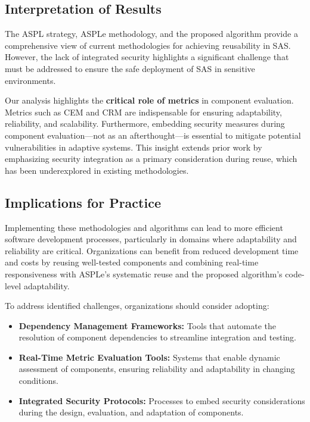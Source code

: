 \documentclass[a4paper,10pt]{article}
\begin{document}
\subsection{Interpretation of Results}

The ASPL strategy, ASPLe methodology, and the proposed algorithm provide a comprehensive view of current methodologies for achieving reusability in SAS. However, the lack of integrated security highlights a significant challenge that must be addressed to ensure the safe deployment of SAS in sensitive environments.

Our analysis highlights the \textbf{critical role of metrics} in component evaluation. Metrics such as CEM and CRM are indispensable for ensuring adaptability, reliability, and scalability. Furthermore, embedding security measures during component evaluation—not as an afterthought—is essential to mitigate potential vulnerabilities in adaptive systems. This insight extends prior work by emphasizing security integration as a primary consideration during reuse, which has been underexplored in existing methodologies.

\subsection{Implications for Practice}

Implementing these methodologies and algorithms can lead to more efficient software development processes, particularly in domains where adaptability and reliability are critical. Organizations can benefit from reduced development time and costs by reusing well-tested components and combining real-time responsiveness with ASPLe’s systematic reuse and the proposed algorithm’s code-level adaptability.

To address identified challenges, organizations should consider adopting:
\begin{itemize}
    \item \textbf{Dependency Management Frameworks:} Tools that automate the resolution of component dependencies to streamline integration and testing.
    \item \textbf{Real-Time Metric Evaluation Tools:} Systems that enable dynamic assessment of components, ensuring reliability and adaptability in changing conditions.
    \item \textbf{Integrated Security Protocols:} Processes to embed security considerations during the design, evaluation, and adaptation of components.
\end{itemize}
\end{document}
